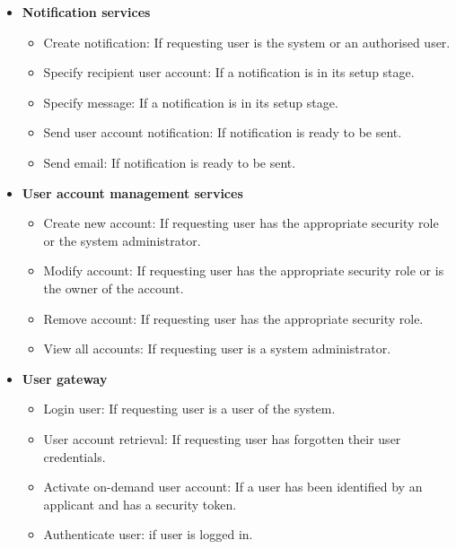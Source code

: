 \documentclass[12pt]{article}
\begin{document}
\begin{itemize}
	\item \textbf{Notification services}
		\begin{itemize}
			\item Create notification: If requesting user is the system or an authorised user.
			\item Specify recipient user account: If a notification is in its setup stage.				
			\item Specify message: If a notification is in its setup stage.
			\item Send user account notification: If notification is ready to be sent.
			\item Send email: If notification is ready to be sent.	
		\end{itemize}
	
	\item \textbf{User account management services}
		\begin{itemize}
			\item Create new account: If requesting user has the appropriate security role or the system administrator.
			\item Modify account: If requesting user has the appropriate security role or is the owner of the account.				
			\item Remove account: If requesting user has the appropriate security role.	
			\item View all accounts: If requesting user is a system administrator.					
		\end{itemize}
	
	\item \textbf{User gateway}
		\begin{itemize}
			\item Login user: If requesting user is a user of the system.
			\item User account retrieval: If requesting user has forgotten their user credentials.				
			\item Activate on-demand user account: If a user has been identified by an applicant and has a security token.
			\item Authenticate user: if user is logged in.						
		\end{itemize}
	

\end{itemize}
\end{document}
